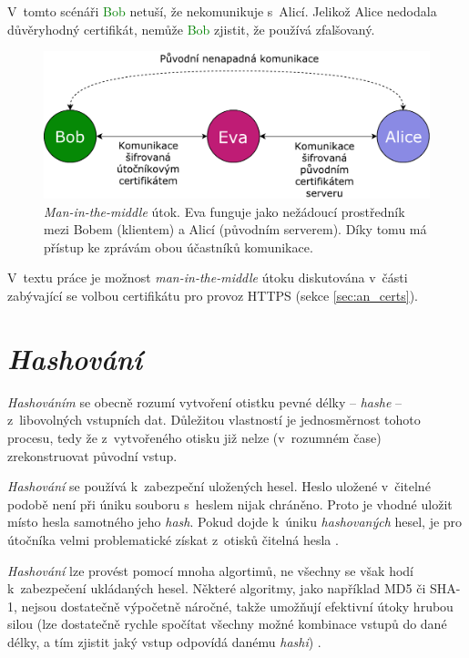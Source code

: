 V~tomto scénáři \textcolor{green}{Bob} netuší, že nekomunikuje s~\textcolor{blue2}{Alicí}. Jelikož \textcolor{blue2}{Alice} nedodala důvěryhodný certifikát, nemůže \textcolor{green}{Bob} zjistit, že používá zfalšovaný.

\begin{figure}[h!]
    \centering
    \includegraphics[width=\textwidth]{images/mitm.pdf}
    \caption[\textit{Man-in-the-middle} útok]{\textit{Man-in-the-middle} útok. Eva funguje jako nežádoucí prostředník mezi Bobem (klientem) a Alicí (původním serverem). Díky tomu má přístup ke zprávám obou účastníků komunikace. \cite{mitm}}
    \label{fig:mitm}
\end{figure}

V~textu práce je možnost \textit{man-in-the-middle} útoku diskutována v~části zabývající se volbou certifikátu pro provoz HTTPS (sekce \ref{sec:an_certs}).

\section{\textit{Hashování}}

\textit{Hashováním} se obecně rozumí vytvoření otistku pevné délky -- \textit{hashe} -- z~libovolných vstupních dat. Důležitou vlastností je jednosměrnost tohoto procesu, tedy že z~vytvořeného otisku již nelze (v~rozumném čase) zrekonstruovat původní vstup. \cite{hash_crackstation}

\textit{Hashování} se používá k~zabezpeční uložených hesel. Heslo uložené v~čitelné podobě není při úniku souboru s~heslem nijak chráněno. Proto je vhodné uložit místo hesla samotného jeho \textit{hash}. Pokud dojde k~úniku \textit{hashovaných} hesel, je pro útočníka velmi problematické získat z~otisků čitelná hesla \cite{hash_crackstation}.

\textit{Hashování} lze provést pomocí mnoha algortimů, ne všechny se však hodí k~zabezpečení ukládaných hesel. Některé algoritmy, jako například MD5 či SHA-1, nejsou dostatečně výpočetně náročné, takže umožňují efektivní útoky hrubou silou (lze dostatečně rychle spočítat všechny možné kombinace vstupů do dané délky, a tím zjistit jaký vstup odpovídá danému \textit{hashi}) \cite{hash_crackstation}. 


